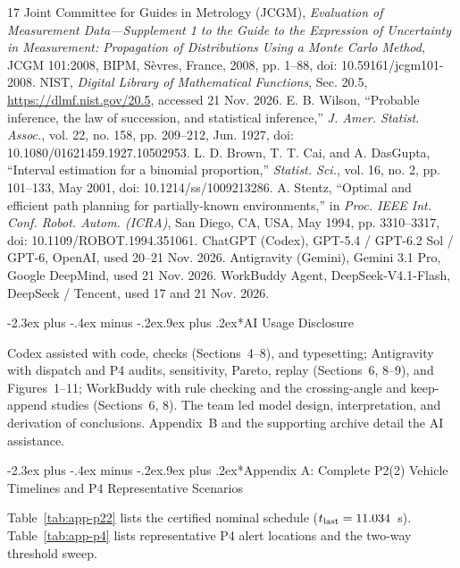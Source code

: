 \documentclass[12pt,a4paper]{article}
\makeatletter
\renewcommand{\section}{\@startsection{section}{1}{\z@}
  {-2.3ex plus -.4ex minus -.2ex}{.9ex plus .2ex}{\normalfont\normalsize\bfseries}}
\makeatother
\begin{document}
\begin{thebibliography}{17}
 Joint Committee for Guides in Metrology (JCGM), \emph{Evaluation of Measurement Data---Supplement 1 to the Guide to the Expression of Uncertainty in Measurement: Propagation of Distributions Using a Monte Carlo Method}, JCGM 101:2008, BIPM, S\`evres, France, 2008, pp. 1--88, doi: 10.59161/jcgm101-2008.
 NIST, \emph{Digital Library of Mathematical Functions}, Sec. 20.5, \url{https://dlmf.nist.gov/20.5}, accessed 21 Nov. 2026.
 E. B. Wilson, ``Probable inference, the law of succession, and statistical inference,'' \emph{J. Amer. Statist. Assoc.}, vol. 22, no. 158, pp. 209--212, Jun. 1927, doi: 10.1080/01621459.1927.10502953.
 L. D. Brown, T. T. Cai, and A. DasGupta, ``Interval estimation for a binomial proportion,'' \emph{Statist. Sci.}, vol. 16, no. 2, pp. 101--133, May 2001, doi: 10.1214/ss/1009213286.
 A. Stentz, ``Optimal and efficient path planning for partially-known environments,'' in \emph{Proc. IEEE Int. Conf. Robot. Autom. (ICRA)}, San Diego, CA, USA, May 1994, pp. 3310--3317, doi: 10.1109/ROBOT.1994.351061.
 ChatGPT (Codex), GPT-5.4 / GPT-6.2 Sol / GPT-6, OpenAI, used 20--21 Nov. 2026.
 Antigravity (Gemini), Gemini 3.1 Pro, Google DeepMind, used 21 Nov. 2026.
 WorkBuddy Agent, DeepSeek-V4.1-Flash, DeepSeek / Tencent, used 17 and 21 Nov. 2026.
\end{thebibliography}
\endgroup

\section*{AI Usage Disclosure}
Codex \cite{archivedai} assisted with code, checks (Sections~4--8), and typesetting; Antigravity \cite{antigravityai} with dispatch and P4 audits, sensitivity, Pareto, replay (Sections~6, 8--9), and Figures~1--11; WorkBuddy \cite{workbuddyai} with rule checking and the crossing-angle and keep-append studies (Sections~6, 8). The team led model design, interpretation, and derivation of conclusions. Appendix~B and the supporting archive detail the AI assistance.

\clearpage
\appendix
\section*{Appendix A: Complete P2(2) Vehicle Timelines and P4 Representative Scenarios}
Table~\ref{tab:app-p22} lists the certified nominal schedule ($t_{\mathrm{last}}=11.034{}$~s). Table~\ref{tab:app-p4} lists representative P4 alert locations and the two-way threshold sweep.
\end{document}
